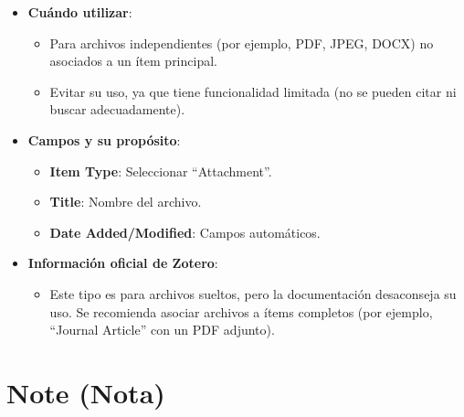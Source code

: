 \documentclass[
  jou,
  floatsintext,
  longtable,
  a4paper,
  nolmodern,
  notxfonts,
  notimes,
  12pt,
  colorlinks=true,linkcolor=blue,citecolor=blue,urlcolor=blue]{apa7}
\providecommand{\tightlist}{%
  \setlength{\itemsep}{0pt}\setlength{\parskip}{0pt}}
\begin{document}
\begin{itemize}
\tightlist
\item
  \textbf{Cuándo utilizar}:

  \begin{itemize}
  \tightlist
  \item
    Para archivos independientes (por ejemplo, PDF, JPEG, DOCX) no
    asociados a un ítem principal.
  \item
    Evitar su uso, ya que tiene funcionalidad limitada (no se pueden
    citar ni buscar adecuadamente).
  \end{itemize}
\item
  \textbf{Campos y su propósito}:

  \begin{itemize}
  \tightlist
  \item
    \textbf{Item Type}: Seleccionar ``Attachment''.
  \item
    \textbf{Title}: Nombre del archivo.
  \item
    \textbf{Date Added/Modified}: Campos automáticos.
  \end{itemize}
\item
  \textbf{Información oficial de Zotero}:

  \begin{itemize}
  \tightlist
  \item
    Este tipo es para archivos sueltos, pero la documentación
    desaconseja su uso. Se recomienda asociar archivos a ítems completos
    (por ejemplo, ``Journal Article'' con un PDF adjunto).
  \end{itemize}
\end{itemize}

\section{Note (Nota)}\label{note-nota}
\end{document}

